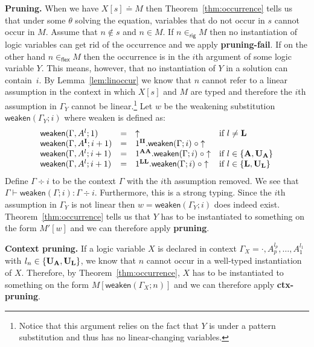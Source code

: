 \documentclass{eptcs}
\newcommand\fI{\textup{$\mathbf{I}$}}
\newcommand\fA{\textup{$\mathbf{A}$}}
\newcommand\fL{\textup{$\mathbf{L}$}}
\newcommand\fUA{{\textup{\textbf{U}}_\textup{\textbf{A}}}}
\newcommand\fUL{{\textup{\textbf{U}}_\textup{\textbf{L}}}}
\theoremstyle{definition}
\begin{document}
\medskip \noindent\textbf{Pruning.}
When we have $X[s]\doteq M$ then Theorem~\ref{thm:occurrence} tells us
that under some $\theta$ solving the equation,
variables that do not occur in $s$ cannot occur in $M$.  Assume
that $n\notin s$ and $n\in M$.  If $n\in_{\textsf{rig}} M$ then no
instantiation of logic variables can get rid of the occurrence and
we apply \textbf{pruning-fail}.  If on the other hand
$n\in_{\textsf{flex}} M$ then the occurrence is in the $i$th argument
of some logic variable $Y$.  This means, however, that no instantiation
of $Y$ in a solution can contain~$i$.
By Lemma~\ref{lem:linoccur} we know that
$n$ cannot refer to a linear assumption in the context in which $X[s]$
and $M$ are typed and therefore the $i$th assumption in $\Gamma_Y$
cannot be linear.\footnote{Notice that this argument relies on the fact
that $Y$ is under a pattern substitution and thus has no linear-changing
variables.}
Let $w$ be the weakening substitution $\textsf{weaken}(\Gamma_Y;i)$
where \textsf{weaken} is defined as:
\[
\begin{array}{llll}
\textsf{weaken}(\Gamma,A^l;1) &=& \uparrow & \textrm{if }l\neq\fL \\
\textsf{weaken}(\Gamma,A^\fI;i+1) &=&
1^{\fI\fI}.\textsf{weaken}(\Gamma;i)\;\circ \uparrow \\
\textsf{weaken}(\Gamma,A^l;i+1) &=&
1^{\fA\fA}.\textsf{weaken}(\Gamma;i)\;\circ \uparrow &
\textrm{if }l\in\{\fA,\fUA\} \\
\textsf{weaken}(\Gamma,A^l;i+1) &=&
1^{\fL\fL}.\textsf{weaken}(\Gamma;i)\;\circ \uparrow &
\textrm{if }l\in\{\fL,\fUL\} \\
\end{array}
\]
Define $\Gamma\div i$ to be the context $\Gamma$ with the $i$th assumption removed.
We see that $\Gamma\vdash\textsf{weaken}(\Gamma;i):\Gamma\div i$.
Furthermore, this is a strong typing.
Since the $i$th assumption in $\Gamma_Y$ is not linear then
$w=\textsf{weaken}(\Gamma_Y;i)$ does indeed exist.
Theorem~\ref{thm:occurrence} tells us that $Y$ has to be
instantiated to something on the form $M'[w]$ and we can therefore apply
\textbf{pruning}.

\medskip \noindent\textbf{Context pruning.}
If a logic variable $X$ is declared in context
$\Gamma_X=\cdot,A_p^{l_p},\ldots,A_1^{l_1}$ with $l_n\in\{\fUA,\fUL\}$,
we know that $n$ cannot occur in a well-typed instantiation of $X$.
Therefore, by Theorem~\ref{thm:occurrence}, $X$ has to be
instantiated to something on the form $M[\textsf{weaken}(\Gamma_X;n)]$
and we can therefore apply \textbf{ctx-pruning}.
\end{document}
